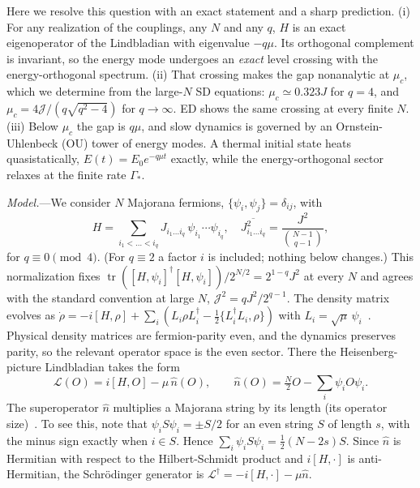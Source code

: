 \documentclass[aps,prl,twocolumn,superscriptaddress,amsmath,amssymb,10pt]{revtex4-2}
\newcommand{\Lc}{\mathcal{L}}
\newcommand{\J}{\mathcal{J}}
\newcommand{\tr}{\operatorname{tr}}
\begin{document}
Here we resolve this question with an exact statement and a sharp prediction. (i) For any realization of the couplings, any $N$ and any $q$, $H$ is an exact eigenoperator of the Lindbladian with eigenvalue $-q\mu$. Its orthogonal complement is invariant, so the energy mode undergoes an \emph{exact} level crossing with the energy-orthogonal spectrum. (ii) That crossing makes the gap nonanalytic at $\mu_c$, which we determine from the large-$N$ SD equations: $\mu_c\simeq0.323J$ for $q=4$, and $\mu_c=4\J/(q\sqrt{q^2-4})$ for $q\to\infty$. ED shows the same crossing at every finite $N$. (iii) Below $\mu_c$ the gap is $q\mu$, and slow dynamics is governed by an Ornstein-Uhlenbeck (OU) tower of energy modes. A thermal initial state heats quasistatically, $E(t)=E_0e^{-q\mu t}$ exactly, while the energy-orthogonal sector relaxes at the finite rate $\Gamma_\ast$.

\emph{Model.}---We consider $N$ Majorana fermions, $\{\psi_i,\psi_j\}=\delta_{ij}$, with
\begin{equation}
H=\sum_{i_1<\dots<i_q}J_{i_1\dots i_q}\,\psi_{i_1}\cdots\psi_{i_q},\quad
\overline{J^2_{i_1\dots i_q}}=\frac{J^2}{\binom{N-1}{q-1}},
\label{eq:H}
\end{equation}
for $q\equiv0 \pmod 4$. (For $q\equiv2$ a factor $i$ is included; nothing below changes.) This normalization fixes $\tr([H,\psi_i]^\dagger[H,\psi_i])/2^{N/2}=2^{1-q}J^2$ at every $N$ and agrees with the standard convention at large $N$, $\J^2=qJ^2/2^{q-1}$. The density matrix evolves as $\dot\rho=-i[H,\rho]+\sum_i(L_i\rho L_i^\dagger-\tfrac12\{L_i^\dagger L_i,\rho\})$ with $L_i=\sqrt{\mu}\,\psi_i$~\cite{Kulkarni2022,Garcia2023}. Physical density matrices are fermion-parity even, and the dynamics preserves parity, so the relevant operator space is the even sector. There the Heisenberg-picture Lindbladian takes the form
\begin{equation}
\Lc(O)=i[H,O]-\mu\,\hat n(O),\qquad \hat n(O)=\tfrac N2 O-\sum_i\psi_iO\psi_i .
\label{eq:L}
\end{equation}
The superoperator $\hat n$ multiplies a Majorana string by its length (its operator size)~\cite{Schuster2023,Bhattacharjee2023,Liu2024}. To see this, note that $\psi_i S\psi_i=\pm S/2$ for an even string $S$ of length $s$, with the minus sign exactly when $i\in S$. Hence $\sum_i\psi_iS\psi_i=\tfrac12(N-2s)S$. Since $\hat n$ is Hermitian with respect to the Hilbert-Schmidt product and $i[H,\cdot]$ is anti-Hermitian, the Schr\"odinger generator is $\Lc^\dagger=-i[H,\cdot]-\mu\hat n$.
\end{document}
